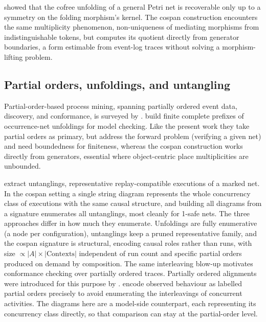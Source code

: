 \citet{haymanUnfoldingGeneralPetri2008} showed that the cofree unfolding of a
general Petri net is recoverable only up to a symmetry on the folding morphism's kernel. The cospan
construction encounters the same multiplicity phenomenon, non-uniqueness of mediating morphisms from
indistinguishable tokens, but computes its quotient directly from generator boundaries, a form
estimable from event-log traces without solving a morphism-lifting problem.

\subsection{Partial orders, unfoldings, and untangling}

Partial-order-based process mining, spanning partially ordered event data, discovery,
and conformance, is surveyed by \citet{leemansPartialorderbasedProcessMining2023}.
\citet{Unfoldings2008} build finite complete prefixes of occurrence-net
unfoldings for model checking. Like the present work they take partial orders as primary, but
address the forward problem (verifying a given net) and need boundedness for finiteness, whereas the
cospan construction works directly from generators, essential where object-centric place
multiplicities are unbounded.

\citet{polyvyanyyUntanglingsNovelApproach2015} extract untanglings, representative
replay-compatible executions of a marked net. In the cospan setting a single string diagram
represents the whole concurrency class of executions with the same causal structure, and building
all diagrams from a signature enumerates all untanglings, most cleanly for 1-safe nets.
The three approaches differ in how much they enumerate. Unfoldings are fully enumerative
(a node per configuration), untanglings keep a pruned representative family, and the cospan
signature is structural, encoding causal roles rather than runs, with size
$\propto |A|\times|\mathrm{Contexts}|$ independent of run count and specific partial orders produced
on demand by composition.
The same interleaving blow-up motivates conformance checking over partially ordered
traces. Partially ordered alignments were introduced for this purpose by
\citet{luConformanceCheckingBased2015}. \citet{leemansPartiallyOrderedStochastic2025} encode observed
behaviour as labelled partial orders precisely to avoid enumerating the interleavings of concurrent
activities. The diagrams here are a model-side counterpart, each representing its concurrency class
directly, so that comparison can stay at the partial-order level.

